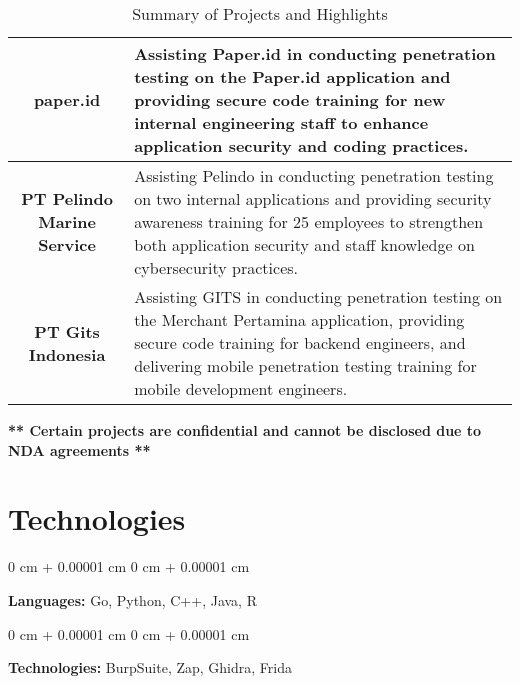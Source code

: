 \documentclass[10pt, letterpaper]{article}
\newenvironment{onecolentry}{
    \begin{adjustwidth}{
        0 cm + 0.00001 cm
    }{
        0 cm + 0.00001 cm
    }
}{
    \end{adjustwidth}
} %
\begin{document}
\begin{table}[ht]
\begin{tabular}{|c|p{11cm}|}
			\textbf{paper.id} & 
			Assisting Paper.id in conducting penetration testing on the Paper.id application and providing secure code training for new internal engineering staff to enhance application security and coding practices. \\ \hline
			
			\textbf{PT Pelindo Marine Service} & 
			Assisting Pelindo in conducting penetration testing on two internal applications and providing security awareness training for 25 employees to strengthen both application security and staff knowledge on cybersecurity practices. \\ \hline
			
			\textbf{PT Gits Indonesia} & 
			Assisting GITS in conducting penetration testing on the Merchant Pertamina application, providing secure code training for backend engineers, and delivering mobile penetration testing training for mobile development engineers. \\ \hline
		\end{tabular}
		\caption{Summary of Projects and Highlights}
		\label{tab:projects_highlights}
	\end{table}
	
	\vspace{0.3cm}
	\noindent \textbf{** Certain projects are confidential and cannot be disclosed due to NDA agreements **}
	
   
   
   
 \section{Technologies}


 \vspace{0.35 cm}
        
        \begin{onecolentry}
            \textbf{Languages:} Go, Python, C++, Java, R
        \end{onecolentry}

        \vspace{0.2 cm}

        \begin{onecolentry}
            \textbf{Technologies:} BurpSuite, Zap, Ghidra, Frida
        \end{onecolentry}


    
\end{document}
